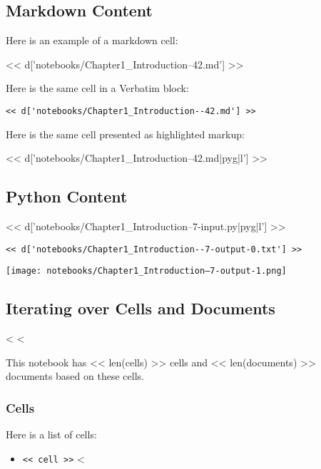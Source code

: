 \documentclass[12pt]{article}
\begin{document}
\subsection*{Markdown Content}

Here is an example of a markdown cell:

<< d['notebooks/Chapter1_Introduction--42.md'] >>

Here is the same cell in a Verbatim block:

\begin{Verbatim}
<< d['notebooks/Chapter1_Introduction--42.md'] >>
\end{Verbatim}

Here is the same cell presented as highlighted markup:

<< d['notebooks/Chapter1_Introduction--42.md|pyg|l'] >>

\subsection*{Python Content}

<< d['notebooks/Chapter1_Introduction--7-input.py|pyg|l'] >>

\begin{Verbatim}
<< d['notebooks/Chapter1_Introduction--7-output-0.txt'] >>
\end{Verbatim}

\texttt{[image: notebooks/Chapter1\_Introduction--7-output-1.png]}

\subsection*{Iterating over Cells and Documents}

<%
<%

This notebook has << len(cells) >> cells and << len(documents) >> documents based on these cells.

\subsubsection*{Cells}

Here is a list of cells:

\begin{itemize}
<%
\item{\verb|<< cell >>|}
<%
\end{itemize}
\end{document}
